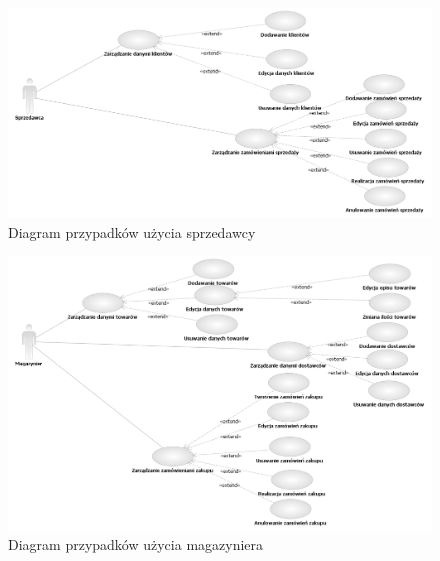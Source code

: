 \begin{figure}[ht]
    \begin{center}
    \includegraphics[angle=-90,scale=0.75]{../img/sprzedawcaUseCase.png}
    \end{center}
    \caption{Diagram przypadków użycia sprzedawcy}
    \label{fig:sprzedawcaUseCase}
\end{figure}


\begin{figure}[ht]
    \begin{center}
    	\includegraphics[angle=-90,scale=0.7]{../img/magazynierUseCase.png}
    	\caption{Diagram przypadków użycia magazyniera}
    	\label{fig:magazynierUseCase}
    \end{center}
\end{figure}

